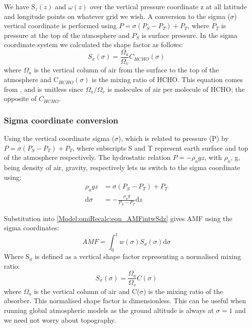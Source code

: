       
      We have S$_z(z)$ and $\omega(z)$ over the vertical pressure coordinate z at all latitude and longitude points on whatever grid we wish. 
      A conversion to the sigma ($\sigma$) vertical coordinate is performed using $ P = \sigma (P_S - P_T) + P_T$, where $P_T$ is pressure at the top of the atmosphere and $P_S$ is surface pressure.
      In the sigma coordinate system we calculated the shape factor as follows:
      \begin{equation} \label{Model:omiRecalc:eqn_ShapeFactorSigma}
      S_\sigma(\sigma) = \frac{\Omega_a}{\Omega_v}C_{HCHO}(\sigma)
      \end{equation}
      where $\Omega_a$ is the vertical column of air from the surface to the top of the atmosphere and C$_{HCHO}(\sigma)$ is the mixing ratio of HCHO.
      This equation comes from \textcite{Palmer2001}, and is unitless since $\Omega_a / \Omega_v$ is molecules of air per molecule of HCHO; the opposite of $C_{HCHO}$.
    
    \subsubsection{Sigma coordinate conversion}
      \label{Model:omiRecalc:sigmacoord}
      
      Using the vertical coordinate sigma ($\sigma$), which is related to pressure (P) by $P=\sigma \left( P_S - P_T \right) + P_T$, where subscripts S and T represent earth surface and top of the atmosphere respectively.
      The hydrostatic relation $P = - \rho_a g z$, with $\rho_a$, g, being density of air, gravity, respectively lets us switch to the sigma coordinate using:
      \begin{align*}
        \rho_a g z & = \sigma \left( P_S - P_T \right) + P_T \\
        \mathrm{d}\sigma  & = - \frac{ \rho_a g }{ P_S - P_T } \mathrm{d}z
      \end{align*}
      
      Substitution into \ref{Model:omiRecalc:eqn_AMFintwSdz} gives AMF using the sigma coordinates:
      \begin{equation} \label{Model:omiRecalc:eqn_AMFintwSdsigma}
      AMF = \int_0^1 w(\sigma) S_\sigma(\sigma) \mathrm{d}\sigma
      \end{equation}
      Where S$_\sigma$ is defined as a vertical shape factor representing a normalised mixing ratio:
      \begin{equation}
      S_\sigma (\sigma) = \frac{\Omega_a}{\Omega_v}C(\sigma)
      \end{equation}
      where $\Omega_a$ is the vertical column of air and C($\sigma$) is the mixing ratio of the absorber.
      This normalised shape factor is dimensionless.
      This can be useful when running global atmospheric models as the ground altitude is always at $\sigma=1$ and we need not worry about topography. 
    
